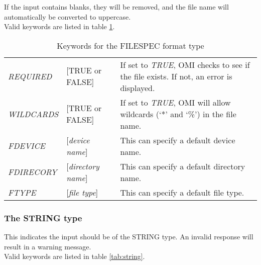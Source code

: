 \documentclass[a4paper]{book}
\begin{document}
If the input contains blanks, they will be removed, and the file name will 
automatically be converted to uppercase. \\
Valid keywords are listed in table \ref{tab:filespec}.

\begin{table}[h!tb]
\begin{minipage}[h!tb]{\textwidth}
\begin{tabular}{llp{6cm}} \hline
\textsl{REQUIRED} & [\textsf{TRUE} or \textsf{FALSE}] & If set to \textsl{TRUE}, OMI checks to see if the file exists. If not, an error is displayed.\\
\textsl{WILDCARDS} & [\textsf{TRUE} or \textsf{FALSE}] & If set to \textsl{TRUE}, OMI will allow wildcards (`*' and `\%') in the file name.\\
\textsl{FDEVICE} & [\textit{device name}] & This can specify a default device name. \\
\textsl{FDIRECORY} & [\textit{directory name}] & This can specify a default directory name. \\
\textsl{FTYPE} & [\textit{file type}] & This can specify a default file type. \\ \hline
\end{tabular}
\caption{Keywords for the FILESPEC format type}\label{tab:filespec}
\end{minipage}
\end{table}

\subsubsection{The STRING type}

This indicates the input should be of the \textsf{STRING} 
type. An invalid response will 
result in a warning message. \\
Valid keywords are listed in table \ref{tab:string}.
\end{document}
